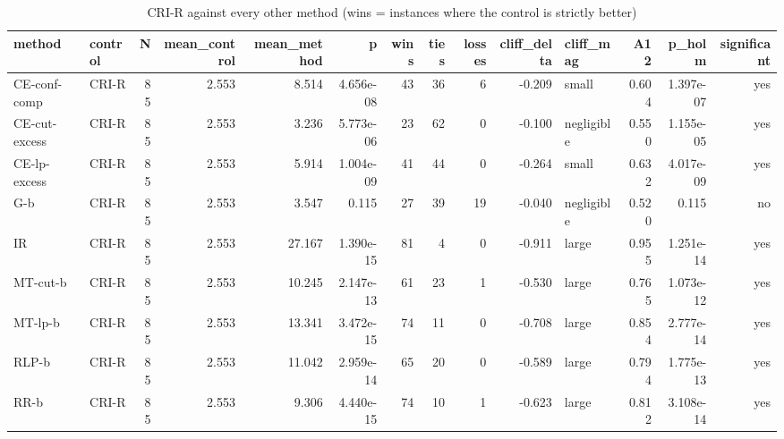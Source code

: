 \begin{table}[htbp]
\centering
\small
\caption{CRI-R against every other method (wins = instances where the control is strictly better)}
\label{tab:E2b_head_to_head_budgets_b1_vs_CRI-R}
\begin{tabular}{llrrrrrrrrlrrr}
\toprule
method & control & N & mean\_control & mean\_method & p & wins & ties & losses & cliff\_delta & cliff\_mag & A12 & p\_holm & significant \\
\midrule
CE-conf-comp & CRI-R & 85 & 2.553 & 8.514 & 4.656e-08 & 43 & 36 & 6 & -0.209 & small & 0.604 & 1.397e-07 & yes \\
CE-cut-excess & CRI-R & 85 & 2.553 & 3.236 & 5.773e-06 & 23 & 62 & 0 & -0.100 & negligible & 0.550 & 1.155e-05 & yes \\
CE-lp-excess & CRI-R & 85 & 2.553 & 5.914 & 1.004e-09 & 41 & 44 & 0 & -0.264 & small & 0.632 & 4.017e-09 & yes \\
G-b & CRI-R & 85 & 2.553 & 3.547 & 0.115 & 27 & 39 & 19 & -0.040 & negligible & 0.520 & 0.115 & no \\
IR & CRI-R & 85 & 2.553 & 27.167 & 1.390e-15 & 81 & 4 & 0 & -0.911 & large & 0.955 & 1.251e-14 & yes \\
MT-cut-b & CRI-R & 85 & 2.553 & 10.245 & 2.147e-13 & 61 & 23 & 1 & -0.530 & large & 0.765 & 1.073e-12 & yes \\
MT-lp-b & CRI-R & 85 & 2.553 & 13.341 & 3.472e-15 & 74 & 11 & 0 & -0.708 & large & 0.854 & 2.777e-14 & yes \\
RLP-b & CRI-R & 85 & 2.553 & 11.042 & 2.959e-14 & 65 & 20 & 0 & -0.589 & large & 0.794 & 1.775e-13 & yes \\
RR-b & CRI-R & 85 & 2.553 & 9.306 & 4.440e-15 & 74 & 10 & 1 & -0.623 & large & 0.812 & 3.108e-14 & yes \\
\bottomrule
\end{tabular}
\end{table}

